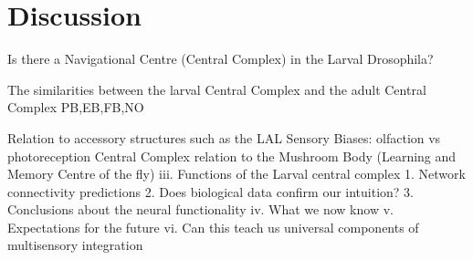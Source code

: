 \chapter{Discussion}
	Is there a Navigational Centre (Central Complex) in the Larval Drosophila?

	The similarities between the larval Central Complex and the adult Central Complex
        PB,EB,FB,NO

        Relation to accessory structures such as the LAL 
        Sensory Biases: olfaction vs photoreception
        Central Complex relation to the Mushroom Body (Learning and Memory Centre of the fly)
iii.	Functions of the Larval central complex 
1.	Network connectivity predictions
2.	Does biological data confirm our intuition?
3.	Conclusions about the neural functionality
iv.	What we now know
v.	Expectations for the future
vi.	Can this teach us universal components of multisensory integration 



\section{}
